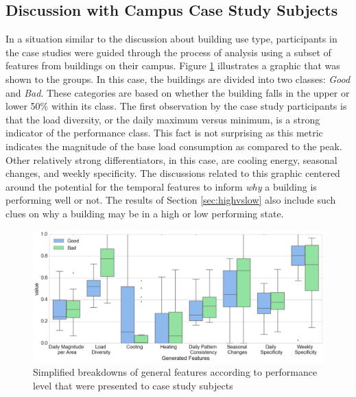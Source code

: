 \subsection{Discussion with Campus Case Study Subjects}
\label{sec:performanceclass_oncasestudy}

In a situation similar to the discussion about building use type, participants in the case studies were guided through the process of analysis using a subset of features from buildings on their campus. Figure \ref{fig:breakdown_performanceclass} illustrates a graphic that was shown to the groups. In this case, the buildings are divided into two classes: \emph{Good} and \emph{Bad}. These categories are based on whether the building falls in the upper or lower 50\% within its class. The first observation by the case study participants is that the load diversity, or the daily maximum versus minimum, is a strong indicator of the performance class. This fact is not surprising as this metric indicates the magnitude of the base load consumption as compared to the peak. Other relatively strong differentiators, in this case, are cooling energy, seasonal changes, and weekly specificity. The discussions related to this graphic centered around the potential for the temporal features to inform \emph{why} a building is performing well or not. The results of Section \ref{sec:highvslow} also include such clues on why a building may be in a high or low performing state. 

\begin{figure}[ht!]
\begin{center}
\includegraphics[width=0.98\columnwidth]{figures/consumptionbreakdown/consumptionbreakdown}
\caption{{Simplified breakdowns of general features according to performance level that were presented to case study subjects
\label{fig:breakdown_performanceclass}%
}}
\end{center}
\end{figure}

